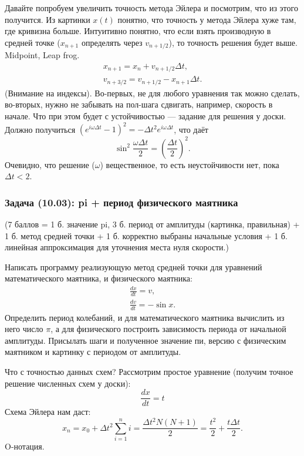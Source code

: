 \documentclass{book}
\begin{document}
Давайте попробуем увеличить точность метода Эйлера и посмотрим, что из этого получится. Из картинки
$x(t)$ понятно, что точность у метода Эйлера хуже там, где кривизна больше. Интуитивно понятно, что
если взять производную в средней точке ($x_{n+1}$ определять через $v_{n + 1/2}$), то точность
решения будет выше. Midpoint, Leap frog.
\begin{eqnarray}
    x_{n + 1} = x_n + v_{n + 1/2} \Delta t, \\
    v_{n + 3/2} = v_{n + 1/2} - x_{n + 1} \Delta t.
\end{eqnarray}
(Внимание на индексы). Во-первых, не для любого уравнения так можно сделать, во-вторых, нужно не
забывать на пол-шага сдвигать, например, скорость в начале. Что при этом будет с устойчивостью ---
задание для решения у доски. Должно получиться $(e^{i \omega \Delta t} - 1)^2 = -\Delta t^2 e^{i
\omega \Delta t}$, что даёт
\begin{equation}
    \sin^2 \frac{\omega \Delta t}{2} = \left( \frac{\Delta t}{2} \right)^2.
\end{equation}
Очевидно, что решение ($\omega$) вещественное, то есть неустойчивости нет, пока $\Delta t < 2$.

\subsubsection{Задача (10.03): pi + период физического маятника}
(7 баллов = 1 б. значение pi, 3 б.
период от амплитуды (картинка, правильная) + 1 б. метод средней точки + 1 б. корректно выбраны начальные
условия + 1 б. линейная аппроксимация для уточнения места нуля скорости.)

Написать программу реализующую метод средней точки для уравнений математического маятника, и
физического маятника:
\begin{eqnarray}
    \frac{dx}{dt} = v, \\
    \frac{dv}{dt} = - \sin x.
\end{eqnarray}
Определить период колебаний, и для математического маятника вычислить из него число $\pi$, а для
физического построить зависимость периода от начальной амплитуды. Присылать шаги и полученное
значение пи, версию с физическим маятником и картинку с периодом от амплитуды.

Что с точностью данных схем? Рассмотрим простое уравнение (получим точное решение численных схем у
доски):
\begin{equation}
    \frac{dx}{dt} = t
\end{equation}
Схема Эйлера нам даст:
\begin{equation}
    x_n = x_0 + \Delta t^2 \sum_{i = 1}^n i = \frac{\Delta t^2 N (N + 1)}{2} = \frac{t^2}{2} +
    \frac{t \Delta t}{2}.
\end{equation}
O-нотация.
\end{document}
